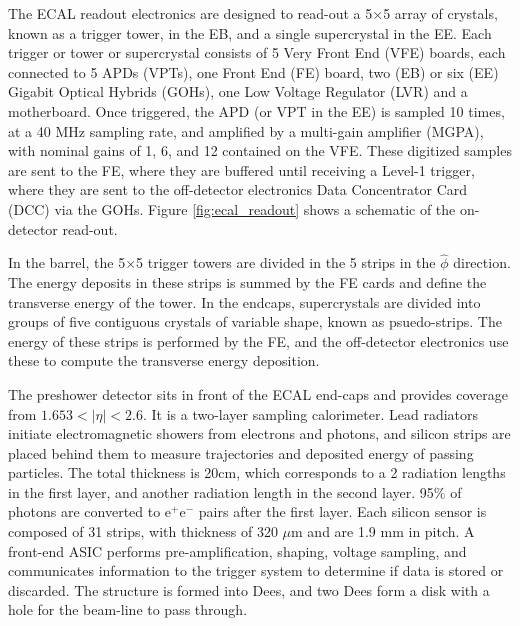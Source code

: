 \par The ECAL readout electronics are designed to read-out a 5$\times$5
array of crystals, known as a trigger tower, in the EB, and a single
supercrystal in the EE.  Each trigger or tower or supercrystal
consists of 5 Very Front End (VFE) boards, each connected to 5 APDs
(VPTs), one Front End (FE) board, two (EB) or six (EE) Gigabit Optical
Hybrids (GOHs), one Low Voltage Regulator (LVR) and a motherboard.
Once triggered, the APD (or VPT in the EE) is sampled 10 times, at a
40 MHz sampling rate, and amplified by a multi-gain amplifier (MGPA),
with nominal gains of 1, 6, and 12 contained on the VFE.  These
digitized samples are sent to the FE, where they are buffered until
receiving a Level-1 trigger, where they are sent to the off-detector
electronics Data Concentrator Card (DCC) via the GOHs.  Figure
\ref{fig:ecal_readout} shows a schematic of the on-detector read-out. 

\par In the barrel, the 5$\times$5 trigger towers are divided in the 5
strips in the $\hat{\phi}$ direction.  The energy deposits in these
strips is summed by the FE cards and define the transverse energy of
the tower.  In the endcaps, supercrystals are divided into groups of
five contiguous crystals of variable shape, known as
psuedo-strips. The energy of these strips is performed by the FE, and
the off-detector electronics use these to compute the transverse energy
deposition.  

\par The preshower detector sits in front of the ECAL end-caps and
provides coverage from $1.653<|\eta|<2.6$.  It is a two-layer sampling
calorimeter.  Lead radiators initiate electromagnetic showers from
electrons and photons, and silicon strips are placed behind them to
measure trajectories and deposited energy of passing particles.  The
total thickness is 20cm, which corresponds to a 2 radiation lengths in
the first layer, and another radiation length in the second layer.
95$\%$ of photons  are converted to e$^{+}$e$^{-}$ pairs after the
first layer.  Each silicon sensor is composed of 31 strips, with
thickness of 320 $\mu$m and are 1.9 mm in pitch.  A front-end ASIC
performs pre-amplification, shaping, voltage sampling, and
communicates information to the trigger system to determine if data is
stored or discarded.  The structure is formed into Dees, and two Dees
form a disk with a hole for the beam-line to pass through.    

